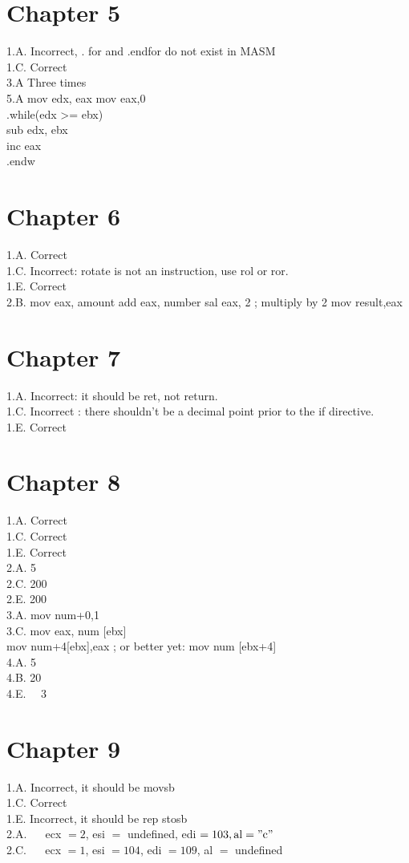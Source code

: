 \documentclass[10pt]{book}
\begin{document}
\section{Chapter 5}
1.A. Incorrect, . for and .endfor do not exist in MASM\\
1.C. Correct\\
3.A Three times\\
5.A mov edx, eax mov eax,0\\
.while(edx >= ebx)\\
sub edx, ebx\\
inc eax\\
.endw

\section{Chapter 6}
1.A. Correct\\
1.C. Incorrect: rotate is not an instruction, use rol or ror.\\
1.E. Correct\\
2.B. mov eax, amount add eax, number sal eax, 2 ; multiply by 2 mov result,eax

\section{Chapter 7}
1.A. Incorrect: it should be ret, not return.\\
1.C. Incorrect : there shouldn't be a decimal point prior to the if directive.\\
1.E. Correct

\section{Chapter 8}
1.A. Correct\\
1.C. Correct\\
1.E. Correct\\
2.A. 5\\
2.C. 200\\
2.E. 200\\
3.A. mov num+0,1\\[0pt]
3.C. mov eax, num [ebx]\\[0pt]
mov num+4[ebx],eax ; or better yet: mov num [ebx+4]\\
4.A. 5\\
4.B. 20\\
4.E. $\quad 3$

\section{Chapter 9}
1.A. Incorrect, it should be movsb\\
1.C. Correct\\
1.E. Incorrect, it should be rep stosb\\
2.A. $\quad$ ecx $=2$, esi $=$ undefined, edi $=103, \mathrm{al}=" \mathrm{c} "$\\
2.C. $\quad$ ecx $=1$, esi $=104$, edi $=109$, al $=$ undefined
\end{document}

